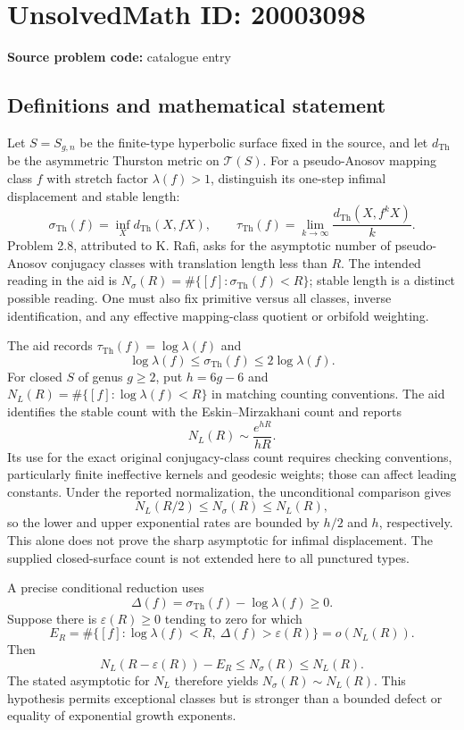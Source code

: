 \documentclass[11pt]{article}
\newcommand{\eps}{\varepsilon}
\begin{document}
\section*{UnsolvedMath ID: 20003098}
\textbf{Source problem code:} catalogue entry
\subsection{Definitions and mathematical statement}
Let $S=S_{g,n}$ be the finite-type hyperbolic surface fixed in the source, and let $d_{\mathrm{Th}}$ be the asymmetric Thurston metric on $\mathcal T(S)$. For a pseudo-Anosov mapping class $f$ with stretch factor $\lambda(f)>1$, distinguish its one-step infimal displacement and stable length:
\[
 \sigma_{\mathrm{Th}}(f)=\inf_Xd_{\mathrm{Th}}(X,fX),\qquad
 \tau_{\mathrm{Th}}(f)=\lim_{k\to\infty}
          \frac{d_{\mathrm{Th}}(X,f^kX)}k.
\]
Problem 2.8, attributed to K. Rafi, asks for the asymptotic number of pseudo-Anosov conjugacy classes with translation length less than $R$. The intended reading in the aid is $N_\sigma(R)=\#\{[f]:\sigma_{\mathrm{Th}}(f)<R\}$; stable length is a distinct possible reading. One must also fix primitive versus all classes, inverse identification, and any effective mapping-class quotient or orbifold weighting.

The aid records $\tau_{\mathrm{Th}}(f)=\log\lambda(f)$ and
\[
 \log\lambda(f)\leq\sigma_{\mathrm{Th}}(f)
                  \leq2\log\lambda(f).
\]
For closed $S$ of genus $g\geq2$, put $h=6g-6$ and $N_L(R)=\#\{[f]:\log\lambda(f)<R\}$ in matching counting conventions. The aid identifies the stable count with the Eskin--Mirzakhani count and reports
\[
 N_L(R)\sim\frac{e^{hR}}{hR}.
\]
Its use for the exact original conjugacy-class count requires checking conventions, particularly finite ineffective kernels and geodesic weights; those can affect leading constants. Under the reported normalization, the unconditional comparison gives
\[
 N_L(R/2)\leq N_\sigma(R)\leq N_L(R),
\]
so the lower and upper exponential rates are bounded by $h/2$ and $h$, respectively. This alone does not prove the sharp asymptotic for infimal displacement. The supplied closed-surface count is not extended here to all punctured types.

A precise conditional reduction uses
\[
 \Delta(f)=\sigma_{\mathrm{Th}}(f)-\log\lambda(f)\geq0.
\]
Suppose there is $\eps(R)\geq0$ tending to zero for which
\[
 E_R=\#\{[f]:\log\lambda(f)<R,\ \Delta(f)>\eps(R)\}
          =o(N_L(R)).
\]
Then
\[
 N_L(R-\eps(R))-E_R\leq N_\sigma(R)\leq N_L(R).
\]
The stated asymptotic for $N_L$ therefore yields $N_\sigma(R)\sim N_L(R)$. This hypothesis permits exceptional classes but is stronger than a bounded defect or equality of exponential growth exponents.
\end{document}
